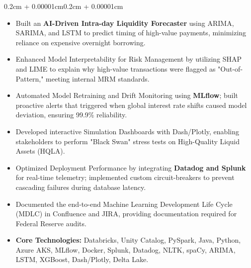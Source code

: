 \documentclass{article}
\newenvironment{highlights}{
    \begin{itemize}[
        topsep=0.10cm, 
        parsep=0.08cm, 
        partopsep=0pt, 
        itemsep=0.08cm, 
        leftmargin=0.4cm + 10pt
    ]
}{
    \end{itemize}
}
\newenvironment{onecolentry}{
    \begin{adjustwidth}{0.2cm + 0.00001cm}{0.2cm + 0.00001cm}
}{
    \end{adjustwidth}
}
\begin{document}
\begin{onecolentry}
\begin{highlights}
        \item Built an \textbf{AI-Driven Intra-day Liquidity Forecaster} using ARIMA, SARIMA, and LSTM to predict timing of high-value payments, minimizing reliance on expensive overnight borrowing.
        \item Enhanced Model Interpretability for Risk Management by utilizing SHAP and LIME to explain why high-value transactions were flagged as "Out-of-Pattern," meeting internal MRM standards.
        \item Automated Model Retraining and Drift Monitoring using \textbf{MLflow}; built proactive alerts that triggered when global interest rate shifts caused model deviation, ensuring 99.9\% reliability.
        \item Developed interactive Simulation Dashboards with Dash/Plotly, enabling stakeholders to perform "Black Swan" stress tests on High-Quality Liquid Assets (HQLA).
        \item Optimized Deployment Performance by integrating \textbf{Datadog and Splunk} for real-time telemetry; implemented custom circuit-breakers to prevent cascading failures during database latency.
        \item Documented the end-to-end Machine Learning Development Life Cycle (MDLC) in Confluence and JIRA, providing documentation required for Federal Reserve audits.
        \item \textbf{Core Technologies:} Databricks, Unity Catalog, PySpark, Java, Python, Azure AKS, MLflow, Docker, Splunk, Datadog, NLTK, spaCy, ARIMA, LSTM, XGBoost, Dash/Plotly, Delta Lake.
    \end{highlights}
\end{onecolentry}

\vspace{0.3cm}
\end{document}
